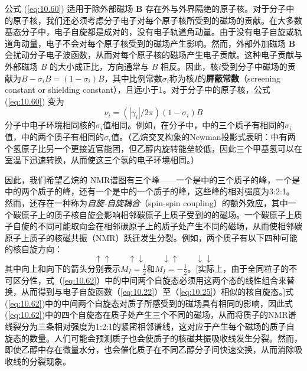     公式 (\ref{eq:10.60}) 适用于除外部磁场 $\mathbf{B}$ 存在外与外界隔绝的原子核。对于分子中的原子核，我们还必须考虑分子电子对每个原子核所受到的磁场的贡献。在大多数基态分子中，电子自旋都是成对的，没有电子轨道角动量。由于没有电子自旋或轨道角动量，电子不会对每个原子核受到的磁场产生影响。然而，外部外加磁场 $\mathbf{B}$ 会扰动分子电子波函数，从而对每个原子核的磁场产生电子贡献。这种电子贡献与外部磁场 $B$ 的大小成正比，方向通常与 $B$ 相反。因此，核$i$受到分子中磁场的贡献为$B - \sigma_iB = \left(1 - \sigma_i\right)B$，其中比例常数$\sigma_i$称为核$I$的\textbf{屏蔽常数}（screening constant or shielding constant），且远小于1。对于分子中的原子核，公式 (\ref{eq:10.60}) 变为
    \begin{equation}
        \nu_i = \left(\left|\gamma_i\right|/2\pi\right)\left(1 - \sigma_i\right)B
        \label{eq:10.61}
    \end{equation}
    分子中电子环境相同核的$\sigma_i$值相同。例如，在分子中，中的三个质子有相同的$\sigma_i$值，中的两个质子有相同的$\sigma_i$值。（乙烷交叉构象的Newman投影式表明：中有两个氢原子比另一个更接近官能团，但乙醇内旋转能垒较低，因此三个甲基氢可以在室温下迅速转换，从而使这三个氢的电子环境相同。）

    因此，我们希望乙烷的 NMR谱图有三个峰——一个是中的三个质子的峰，一个是中的两个质子的峰，还有一个是中的一个质子的峰，这些峰的相对强度为3:2:1。然而，还存在一种称为\textit{自旋-自旋耦合}（spin-spin coupling）的额外效应，其中一个碳原子上的质子核自旋会影响相邻碳原子上质子受到的的磁场。一个碳原子上质子自旋的不同可能取向会在相邻碳原子上的质子处产生不同的磁场，从而使相邻碳原子上质子的核磁共振（NMR）跃迁发生分裂。例如，两个质子有以下四种可能的核自旋方向：
    \begin{equation}
        \uparrow\uparrow \qquad \uparrow\downarrow \qquad \downarrow\uparrow \qquad \downarrow\downarrow
        \label{eq:10.62}
    \end{equation}
    其中向上和向下的箭头分别表示$M_I = \frac{1}{2}$和$M_I = -\frac{1}{2}$。[实际上，由于全同粒子的不可区分性，式（\ref{eq:10.62}）中的中间两个自旋态必须用这两个态的线性组合来替换，从而得到与电子自旋函数（\ref{eq:10.22}）至（\ref{eq:10.25}）相似的核自旋态。]式(\ref{eq:10.62})中的中间两个自旋态对质子所感受到的磁场具有相同的影响，因此式(\ref{eq:10.62})中的四个自旋态在质子处产生三个不同的磁场，从而将质子的NMR谱线裂分为三条相对强度为1:2:1的紧密相邻谱线，这对应于产生每个磁场的质子自旋态的数量。人们可能会预测质子也会使质子的核磁共振吸收线发生分裂。然而，即使乙醇中存在微量水分，也会催化质子在不同乙醇分子间快速交换，从而消除吸收线的分裂现象。


